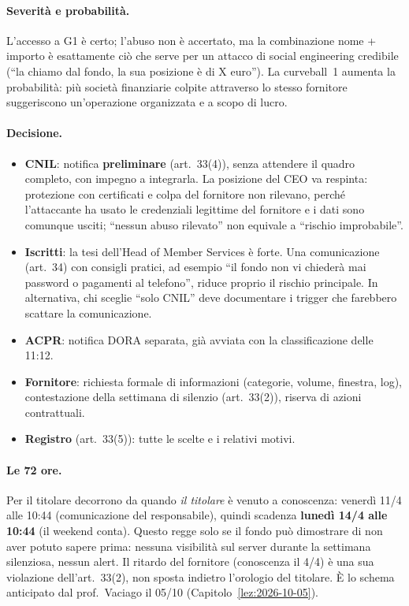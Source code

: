 \begin{integrazione}
\paragraph{Severità e probabilità.} L'accesso a G1 è certo; l'abuso non è accertato, ma la
combinazione nome + importo è esattamente ciò che serve per un attacco di social engineering
credibile (``la chiamo dal fondo, la sua posizione è di X euro''). La curveball~1 aumenta la
probabilità: più società finanziarie colpite attraverso lo stesso fornitore suggeriscono un'operazione
organizzata e a scopo di lucro.

\paragraph{Decisione.}
\begin{itemize}
  \item \textbf{CNIL}: notifica \textbf{preliminare} (art.~33(4)), senza attendere il quadro completo,
    con impegno a integrarla. La posizione del CEO va respinta: protezione con certificati e colpa del
    fornitore non rilevano, perché l'attaccante ha usato le credenziali legittime del fornitore e i
    dati sono comunque usciti; ``nessun abuso rilevato'' non equivale a ``rischio improbabile''.
  \item \textbf{Iscritti}: la tesi dell'Head of Member Services è forte. Una comunicazione (art.~34)
    con consigli pratici, ad esempio ``il fondo non vi chiederà mai password o pagamenti al
    telefono'', riduce proprio il rischio principale. In alternativa, chi sceglie ``solo CNIL'' deve
    documentare i trigger che farebbero scattare la comunicazione.
  \item \textbf{ACPR}: notifica DORA separata, già avviata con la classificazione delle 11:12.
  \item \textbf{Fornitore}: richiesta formale di informazioni (categorie, volume, finestra, log),
    contestazione della settimana di silenzio (art.~33(2)), riserva di azioni contrattuali.
  \item \textbf{Registro} (art.~33(5)): tutte le scelte e i relativi motivi.
\end{itemize}

\paragraph{Le 72 ore.} Per il titolare decorrono da quando \emph{il titolare} è venuto a conoscenza:
venerdì 11/4 alle 10:44 (comunicazione del responsabile), quindi scadenza \textbf{lunedì 14/4 alle
10:44} (il weekend conta). Questo regge solo se il fondo può dimostrare di non aver potuto sapere
prima: nessuna visibilità sul server durante la settimana silenziosa, nessun alert. Il ritardo del
fornitore (conoscenza il 4/4) è una sua violazione dell'art.~33(2), non sposta indietro l'orologio
del titolare. È lo schema anticipato dal prof.~Vaciago il 05/10 (Capitolo~\ref{lez:2026-10-05}).


\end{integrazione}
